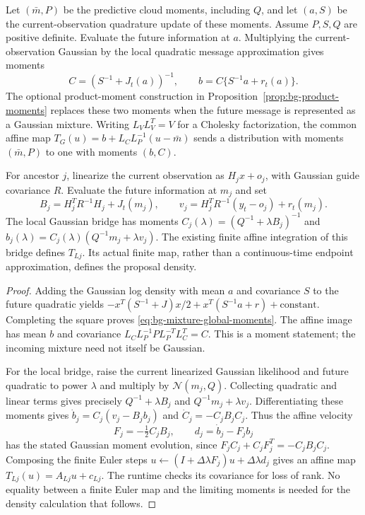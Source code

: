 \begin{proposition}
\label{prop:bg-mixture-guided-maps}
Let $(\bar m,P)$ be the predictive cloud moments, including $Q$, and let
$(a,S)$ be the current-observation quadrature update of these moments.
Assume $P,S,Q$ are positive definite. Evaluate the future information at $a$.
Multiplying the current-observation Gaussian by the local quadratic message
approximation gives moments
\begin{equation}
 C=(S^{-1}+J_t(a))^{-1},\qquad
 b=C\{S^{-1}a+r_t(a)\}.
 \label{eq:bg-mixture-global-moments}
\end{equation}
The optional product-moment construction in
Proposition~\ref{prop:bg-product-moments} replaces these two moments when the
future message is represented as a Gaussian mixture.
Writing $L_VL_V^T=V$ for a Cholesky factorization, the common affine map
$T_G(u)=b+L_CL_P^{-1}(u-\bar m)$ sends a distribution with moments
$(\bar m,P)$ to one with moments $(b,C)$.

For ancestor $j$, linearize the current observation as
$H_jx+o_j$, with Gaussian guide covariance $R$. Evaluate the future
information at $m_j$ and set
\begin{equation}
 B_j=H_j^TR^{-1}H_j+J_t(m_j),\qquad
 v_j=H_j^TR^{-1}(y_t-o_j)+r_t(m_j).
 \label{eq:bg-mixture-local-information}
\end{equation}
The local Gaussian bridge has moments
$C_j(\lambda)=(Q^{-1}+\lambda B_j)^{-1}$ and
$b_j(\lambda)=C_j(\lambda)(Q^{-1}m_j+\lambda v_j)$.
The existing finite affine integration of this bridge defines $T_{Lj}$.
Its actual finite map, rather than a continuous-time endpoint approximation,
defines the proposal density.
\end{proposition}
\begin{proof}
Adding the Gaussian log density with mean $a$ and covariance $S$ to the
future quadratic yields
$-x^T(S^{-1}+J)x/2+x^T(S^{-1}a+r)+\mathrm{constant}$.
Completing the square proves \eqref{eq:bg-mixture-global-moments}.
The affine image has mean $b$ and covariance
$L_CL_P^{-1}P L_P^{-T}L_C^T=C$. This is a moment statement; the incoming
mixture need not itself be Gaussian.

For the local bridge, raise the current linearized Gaussian likelihood and
future quadratic to power $\lambda$ and multiply by
$\mathcal N(m_j,Q)$. Collecting quadratic and linear terms gives precisely
$Q^{-1}+\lambda B_j$ and $Q^{-1}m_j+\lambda v_j$.
Differentiating these moments gives
$\dot b_j=C_j(v_j-B_jb_j)$ and
$\dot C_j=-C_jB_jC_j$. Thus the affine velocity
\[
 F_j=-\tfrac12 C_jB_j,\qquad
 d_j=\dot b_j-F_jb_j
\]
has the stated Gaussian moment evolution, since
$F_jC_j+C_jF_j^T=-C_jB_jC_j$. Composing the finite Euler steps
$u\leftarrow(I+\Delta\lambda F_j)u+\Delta\lambda d_j$ gives an affine map
$T_{Lj}(u)=A_{Lj}u+c_{Lj}$. The runtime checks its covariance for loss of
rank. No equality between a finite Euler map and the limiting moments is
needed for the density calculation that follows.
\end{proof}

